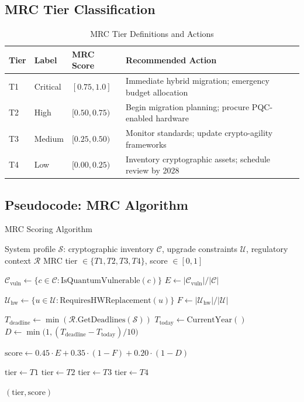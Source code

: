 \documentclass[journal]{IEEEtran}
\begin{document}
\subsection{MRC Tier Classification}

\begin{table}[t]
\caption{MRC Tier Definitions and Actions}
\label{tab:mrc_tiers}
\centering
\footnotesize
\renewcommand{\arraystretch}{1.2}
\begin{tabular}{@{}C{0.8cm}L{1.5cm}C{1.5cm}L{3.8cm}@{}}
\toprule
\textbf{Tier} & \textbf{Label} & \textbf{MRC Score} & \textbf{Recommended Action} \\
\midrule
T1 & Critical & $[0.75, 1.0]$ & Immediate hybrid migration; emergency budget allocation \\
T2 & High     & $[0.50, 0.75)$ & Begin migration planning; procure PQC-enabled hardware \\
T3 & Medium   & $[0.25, 0.50)$ & Monitor standards; update crypto-agility frameworks \\
T4 & Low      & $[0.00, 0.25)$ & Inventory cryptographic assets; schedule review by 2028 \\
\bottomrule
\end{tabular}
\end{table}

\subsection{Pseudocode: MRC Algorithm}

\begin{algorithm}[t]
\caption{MRC Scoring Algorithm}
\label{alg:mrc}
\begin{algorithmic}[1]
\REQUIRE System profile $\mathcal{S}$: cryptographic inventory $\mathcal{C}$,
  upgrade constraints $\mathcal{U}$, regulatory context $\mathcal{R}$
\ENSURE MRC tier $\in \{T1, T2, T3, T4\}$, score $\in [0,1]$

\STATE $\mathcal{C}_{\text{vuln}} \leftarrow \{c \in \mathcal{C} : \text{IsQuantumVulnerable}(c)\}$
\STATE $E \leftarrow |\mathcal{C}_{\text{vuln}}| / |\mathcal{C}|$

\STATE $\mathcal{U}_{\text{hw}} \leftarrow \{u \in \mathcal{U} : \text{RequiresHWReplacement}(u)\}$
\STATE $F \leftarrow |\mathcal{U}_{\text{hw}}| / |\mathcal{U}|$

\STATE $T_{\text{deadline}} \leftarrow \min(\mathcal{R}.\text{GetDeadlines}(\mathcal{S}))$
\STATE $T_{\text{today}} \leftarrow \text{CurrentYear}()$
\STATE $D \leftarrow \min\bigl(1, (T_{\text{deadline}} - T_{\text{today}}) / 10\bigr)$

\STATE $\text{score} \leftarrow 0.45 \cdot E + 0.35 \cdot (1 - F) + 0.20 \cdot (1 - D)$

  \STATE $\text{tier} \leftarrow T1$ 
  \STATE $\text{tier} \leftarrow T2$ 
  \STATE $\text{tier} \leftarrow T3$ 
\ELSE
  \STATE $\text{tier} \leftarrow T4$ 
\ENDIF

\RETURN $(\text{tier}, \text{score})$
\end{algorithmic}
\end{algorithm}
\end{document}
